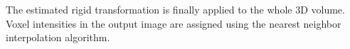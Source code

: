 \documentclass[smallextended]{svjour3}       %
\newcommand{\etal}{\mbox{\emph{et al.\ }}}
\begin{document}
%
%
The estimated rigid transformation is finally applied to the whole 3D
volume.  Voxel intensities in the output image are assigned using the
nearest neighbor interpolation algorithm.
\end{document}
